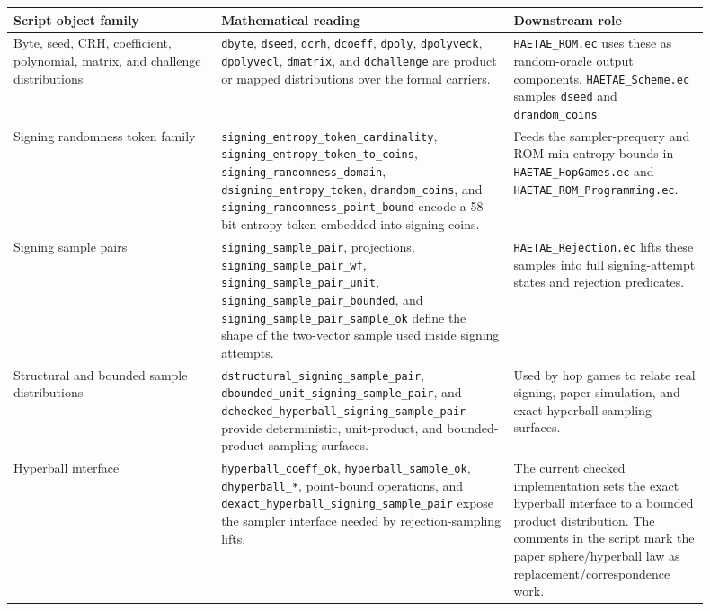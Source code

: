 \documentclass[11pt]{report}
\DeclareRobustCommand{\file}[1]{\ifmmode\text{\nolinkurl{#1}}\else\nolinkurl{#1}\fi}
\DeclareRobustCommand{\ec}[1]{\ifmmode\text{\nolinkurl{#1}}\else\nolinkurl{#1}\fi}
\theoremstyle{definition}
\theoremstyle{plain}
\begin{document}
\begin{longtable}{p{0.27\linewidth}p{0.38\linewidth}p{0.25\linewidth}}
\toprule
\textbf{Script object family} & \textbf{Mathematical reading} & \textbf{Downstream role} \\
\midrule
Byte, seed, CRH, coefficient, polynomial, matrix, and challenge distributions &
\ec{dbyte}, \ec{dseed}, \ec{dcrh}, \ec{dcoeff}, \ec{dpoly},
\ec{dpolyveck}, \ec{dpolyvecl}, \ec{dmatrix}, and \ec{dchallenge} are product
or mapped distributions over the formal carriers. &
\ec{HAETAE\_ROM.ec} uses these as random-oracle output components.
\file{HAETAE\_Scheme.ec} samples \ec{dseed} and \ec{drandom\_coins}. \\
\midrule
Signing randomness token family &
\ec{signing\_entropy\_token\_cardinality},
\ec{signing\_entropy\_token\_to\_coins},
\ec{signing\_randomness\_domain}, \ec{dsigning\_entropy\_token},
\ec{drandom\_coins}, and \ec{signing\_randomness\_point\_bound} encode a
58-bit entropy token embedded into signing coins. &
Feeds the sampler-prequery and ROM min-entropy bounds in
\file{HAETAE\_HopGames.ec} and \file{HAETAE\_ROM\_Programming.ec}. \\
\midrule
Signing sample pairs &
\ec{signing\_sample\_pair}, projections, \ec{signing\_sample\_pair\_wf},
\ec{signing\_sample\_pair\_unit}, \ec{signing\_sample\_pair\_bounded}, and
\ec{signing\_sample\_pair\_sample\_ok} define the shape of the two-vector
sample used inside signing attempts. &
\file{HAETAE\_Rejection.ec} lifts these samples into full signing-attempt
states and rejection predicates. \\
\midrule
Structural and bounded sample distributions &
\ec{dstructural\_signing\_sample\_pair},
\ec{dbounded\_unit\_signing\_sample\_pair}, and
\ec{dchecked\_hyperball\_signing\_sample\_pair} provide deterministic,
unit-product, and bounded-product sampling surfaces. &
Used by hop games to relate real signing, paper simulation, and exact-hyperball
sampling surfaces. \\
\midrule
Hyperball interface &
\ec{hyperball\_coeff\_ok}, \ec{hyperball\_sample\_ok},
\ec{dhyperball\_*}, point-bound operations, and
\ec{dexact\_hyperball\_signing\_sample\_pair} expose the sampler interface
needed by rejection-sampling lifts. &
The current checked implementation sets the exact hyperball interface to a
bounded product distribution.  The comments in the script mark the paper
sphere/hyperball law as replacement/correspondence work. \\
\bottomrule
\end{longtable}
\end{document}
